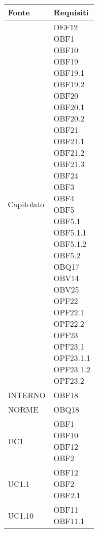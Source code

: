 \documentclass{scalatekids-article}
\begin{document}
\begin{longtable}[H]{|p{5.5cm}|p{5.5cm}|}
  \hline
  \textbf{Fonte} & \textbf{Requisiti}\\
  \hline
  Capitolato & \multiLineCell[t]{DEF12\\OBF1\\OBF10\\OBF19\\OBF19.1\\OBF19.2\\OBF20\\OBF20.1\\OBF20.2\\OBF21\\OBF21.1\\OBF21.2\\OBF21.3\\OBF24\\OBF3\\OBF4\\OBF5\\OBF5.1\\OBF5.1.1\\OBF5.1.2\\OBF5.2\\OBQ17\\OBV14\\OBV25\\OPF22\\OPF22.1\\OPF22.2\\OPF23\\OPF23.1\\OPF23.1.1\\OPF23.1.2\\OPF23.2\\}\\
  \hline
  INTERNO & \multiLineCell[t]{OBF18\\}\\
  \hline
  NORME & \multiLineCell[t]{OBQ18\\}\\
  \hline
  UC1 & \multiLineCell[t]{OBF1\\OBF10\\OBF12\\OBF2\\}\\
  \hline
  UC1.1 & \multiLineCell[t]{OBF12\\OBF2\\OBF2.1\\}\\
  \hline
  UC1.10 & \multiLineCell[t]{OBF11\\OBF11.1\\}\\

\end{longtable}
\end{document}
